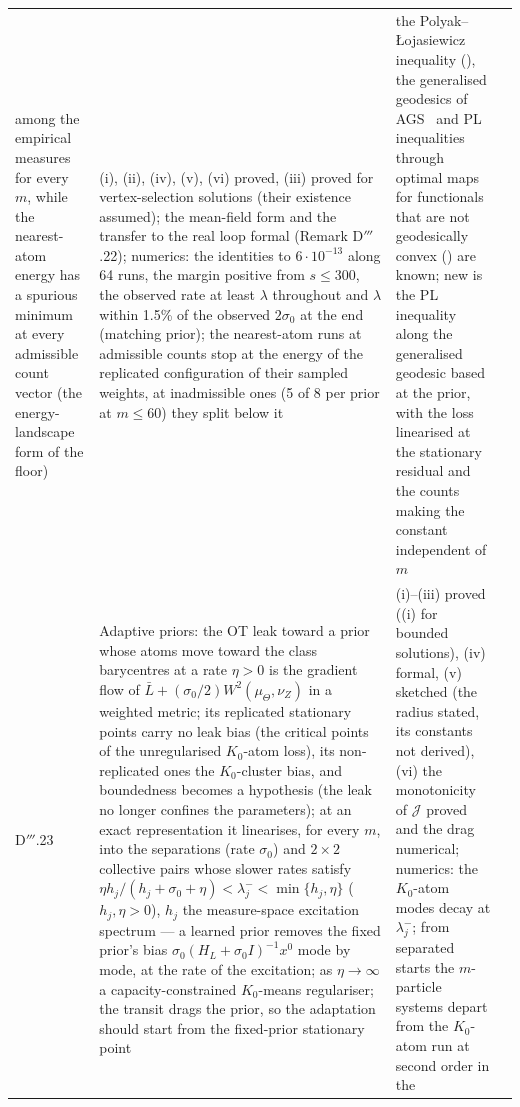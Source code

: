{\begin{longtable}{@{}>{\raggedright\arraybackslash}p{}>{\raggedright\arraybackslash}p{}%
>{\raggedright\arraybackslash}p{}>{\raggedright\arraybackslash}p{}@{}}
among the empirical measures for every $m$, while the nearest-atom energy has a spurious minimum at every admissible
count vector (the energy-landscape form of the floor)
& (i), (ii), (iv), (v), (vi) proved, (iii) proved for vertex-selection solutions (their existence assumed); the
mean-field form and the transfer to the real loop formal (Remark D$'''$.22); numerics: the identities to
$6\cdot10^{-13}$ along 64 runs, the margin positive from $s\le300$, the observed rate at least $\lambda$ throughout
and $\lambda$ within 1.5\% of the observed $2\sigma_0$ at the end (matching prior); the nearest-atom runs at
admissible counts stop at the energy of the replicated configuration of their sampled weights, at inadmissible ones
(5 of 8 per prior at $m\le60$) they split below it
& the Polyak--{\L}ojasiewicz inequality (\cite{S47}), the generalised geodesics of AGS~\cite[\S9.2]{ags2008} and PL
inequalities through optimal maps for functionals that are not geodesically convex (\cite{S48}) are known; new is the
PL inequality along the generalised geodesic based at the prior, with the loss linearised at the stationary residual
and the counts making the constant independent of $m$\\
\addlinespace[0.5pt]
D$'''$.23 & Adaptive priors: the OT leak toward a prior whose atoms move toward the class barycentres at a rate
$\eta > 0$ is the gradient flow of $\bar L + (\sigma_0/2)W^2(\mu_\Theta,\nu_Z)$ in a weighted metric; its replicated
stationary points carry no leak bias (the critical points of the unregularised $K_0$-atom loss), its non-replicated
ones the $K_0$-cluster bias, and boundedness becomes a hypothesis (the leak no longer confines the parameters); at an
exact representation it linearises, for every $m$, into the separations (rate $\sigma_0$) and $2\times2$ collective
pairs whose slower rates satisfy $\eta h_j/(h_j + \sigma_0 + \eta) < \lambda_j^- < \min\{h_j,\eta\}$
($h_j,\eta > 0$), $h_j$ the measure-space excitation spectrum --- a learned prior removes the fixed prior's bias
$\sigma_0(H_L + \sigma_0I)^{-1}x^0$ mode by mode, at the rate of the excitation; as $\eta\to\infty$ a
capacity-constrained $K_0$-means regulariser; the transit drags the prior, so the adaptation should start from the
fixed-prior stationary point
& (i)--(iii) proved ((i) for bounded solutions), (iv) formal, (v) sketched (the radius stated, its constants not
derived), (vi) the monotonicity of $\mathcal{J}$ proved and the drag numerical; numerics: the $K_0$-atom modes decay
at $\lambda_j^-$; from separated starts the $m$-particle systems depart from the $K_0$-atom run at second order in the

\end{longtable}}
